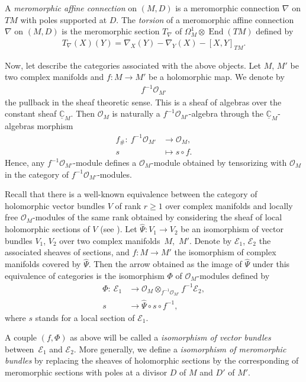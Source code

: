 \documentclass[pdftex]{sigma}
\numberwithin{equation}{section}
\begin{document}
A \textit{meromorphic affine connection} on $(M,D)$ is a meromorphic connection $\nabla$ on $TM$ with poles supported at $D$. The \textit{torsion} of a meromorphic affine connection $\nabla$ on $(M,D)$ is the meromorphic section $T_\nabla$ of $\Omega^1_M \otimes \operatorname{End}(TM)$ defined by
\begin{gather}\label{torsionaffine}
 T_\nabla(X)(Y) = \nabla_X(Y) - \nabla_Y(X) - [X,Y]_{TM}. \end{gather}

Now, let describe the categories associated with the above objects. Let $M$, $M'$ be two complex manifolds and $f\colon M\longrightarrow M'$ be a holomorphic map. We denote by \begin{gather*}%
 f^{-1}\mathcal{O}_{M'} \end{gather*}
 the pullback in the sheaf theoretic sense. This is a sheaf of algebras over the constant sheaf $\underline{\mathbb{C}}_M$. Then $\mathcal{O}_M$ is naturally a $f^{-1}\mathcal{O}_{M'}$-algebra through the $\underline{\mathbb{C}}_M$-algebras morphism
\begin{align*}%
f_\# \colon\ f^{-1}\mathcal{O}_{M'} & \longrightarrow \mathcal{O}_M,\nonumber \\
 s & \mapsto s\circ f.
\end{align*}
 Hence, any $f^{-1}\mathcal{O}_{M'}$-module defines a $\mathcal{O}_M$-module obtained by tensorizing with $\mathcal{O}_M$ in the category of $f^{-1}\mathcal{O}_{M'}$-modules.

Recall that there is a well-known equivalence between the category of holomorphic vector bundles $V$ of rank $r\geq 1$ over complex manifolds and locally free $\mathcal{O}_M$-modules of the same rank obtained by considering the sheaf of local holomorphic sections of $V$ (see \cite[Proposition~4.1]{Sabbah}). Let $\hat{\Psi}\colon V_1 \longrightarrow V_2$ be an isomorphism of vector bundles $V_1$, $V_2$ over two complex mani\-folds~$M$,~$M'$. Denote by $\mathcal{E}_1$, $\mathcal{E}_2$ the associated sheaves of sections, and $f\colon M \longrightarrow M'$ the isomorphism of complex manifolds covered by $\hat{\Psi}$. Then the arrow obtained as the image of $\hat{\Psi}$ under this equivalence of categories is the isomorphism $\Phi$ of $\mathcal{O}_M$-modules defined by
 \begin{align}
 \Phi \colon\ \mathcal{E}_1 & \longrightarrow \mathcal{O}_M\otimes_{f^{-1}\mathcal{O}_{M'}} f^{-1}\mathcal{E}_2,\nonumber\\
 s& \longrightarrow \hat{\Psi} \circ s \circ f^{-1},\label{isovector}
 \end{align}
 where $s$ stands for a local section of $\mathcal{E}_1$. \begin{Definition}\label{isovect}A couple $(f,\Phi)$ as above will be called a \textit{isomorphism of vector bundles} between~$\mathcal{E}_1$ and $\mathcal{E}_2$. More generally, we define a \textit{isomorphism of meromorphic bundles} by replacing the sheaves of holomorphic sections by the corresponding of meromorphic sections with poles at a divisor $D$ of $M$ and $D'$ of $M'$. \end{Definition}
\end{document}
